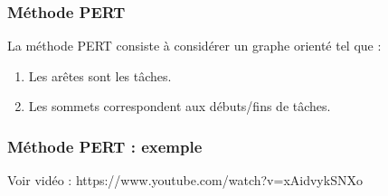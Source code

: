 \documentclass[draft]{beamer}
\begin{document}
\begin{frame}[fragile]
    \frametitle{Méthode PERT}
    La méthode PERT consiste à considérer un graphe orienté tel que :
    \begin{enumerate}
        \item Les arêtes sont les tâches.
        \item Les sommets correspondent aux débuts/fins de tâches.
    \end{enumerate}
\end{frame}

\begin{frame}
    \frametitle{Méthode PERT : exemple}
    Voir vidéo : https://www.youtube.com/watch?v=xAidvykSNXo
\end{frame}
\end{document}
